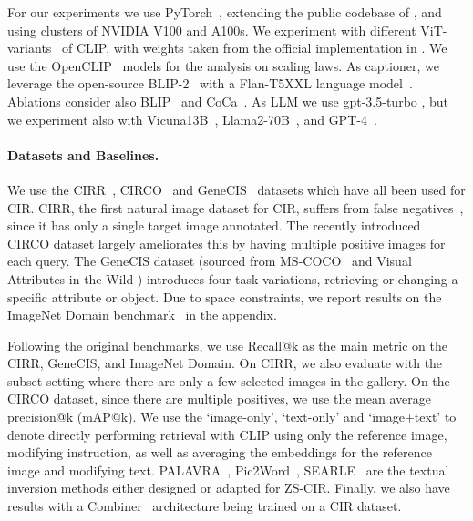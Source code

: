 \documentclass{article} \usepackage{iclr2024_conference,times}
\begin{document}
\label{subsec:implementation_details}
For our experiments we use PyTorch~\citep{pytorch}, extending the public codebase of \cite{searle}, and using clusters of NVIDIA V100 and A100s. We experiment with different ViT-variants~\citep{vit} of CLIP, with weights taken from the official implementation in \citep{clip}. We use the OpenCLIP~\citep{openclip} models for the analysis on scaling laws. As captioner, we leverage the open-source BLIP-2~\citep{blip2} with a Flan-T5XXL language model~\citep{flant5}. Ablations consider also BLIP~\citep{blip} and CoCa~\citep{coca}. As LLM we use gpt-3.5-turbo \cite{gpt-3}, but we experiment also with Vicuna13B~\citep{vicuna2023}, Llama2-70B~\citep{llama2}, and GPT-4~\citep{gpt4}.

\paragraph{Datasets and Baselines.} We use the CIRR~\citep{cirr}, CIRCO~\citep{searle} and GeneCIS~\citep{vaze2023genecis} datasets which have all been used for CIR. CIRR, the first natural image dataset for CIR, suffers from false negatives~\citep{searle}, since it has only a single target image annotated. The recently introduced CIRCO dataset largely ameliorates this by having multiple positive images for each query. The GeneCIS dataset (sourced from MS-COCO~\citep{coco} and Visual Attributes in the Wild \citep{vaw,visualgenome}) introduces four task variations, retrieving or changing a specific attribute or object. Due to space constraints, we report results on the ImageNet Domain benchmark~\citep{pic2word} in the appendix. 

Following the original benchmarks, we use Recall@k as the main metric on the CIRR, GeneCIS, and ImageNet Domain. On CIRR, we also  evaluate with the subset setting where there are only a few selected images in the gallery. On the CIRCO dataset, since there are multiple positives, we use the mean average precision@k (mAP@k). We use the `image-only', `text-only' and `image+text' to denote directly performing retrieval with CLIP using only the reference image, modifying instruction, as well as averaging the embeddings for the reference image and modifying text. PALAVRA~\citep{palavra}, Pic2Word~\citep{pic2word}, SEARLE~\citep{searle} are the textual inversion methods either designed or adapted for ZS-CIR. Finally, we also have results with a Combiner~\citep{combiner} architecture being trained on a CIR dataset. 
\end{document}

